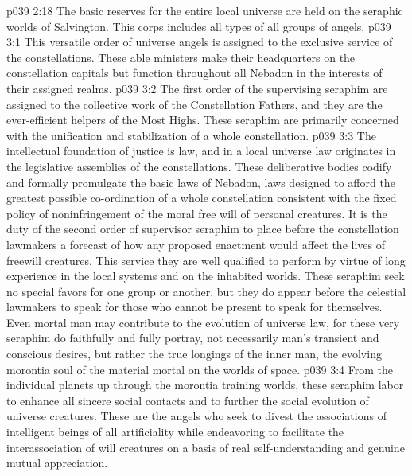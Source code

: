 \pc \vs p039 2:18 The basic reserves for the entire local universe are held on the seraphic worlds of Salvington. This corps includes all types of all groups of angels.
\vs p039 3:1 This versatile order of universe angels is assigned to the exclusive service of the constellations. These able ministers make their headquarters on the constellation capitals but function throughout all Nebadon in the interests of their assigned realms.
\pc \vs p039 3:2 \bibnobreakspace {} The first order of the supervising seraphim are assigned to the collective work of the Constellation Fathers, and they are the ever\hyp{}efficient helpers of the Most Highs. These seraphim are primarily concerned with the unification and stabilization of a whole constellation.\plusone
\pc \vs p039 3:3 \bibnobreakspace {} The intellectual foundation of justice is law, and in a local universe law originates in the legislative assemblies of the constellations. These deliberative bodies codify and formally promulgate the basic laws of Nebadon, laws designed to afford the greatest possible co\hyp{}ordination of a whole constellation consistent with the fixed policy of noninfringement of the moral free will of personal creatures. It is the duty of the second order of supervisor seraphim to place before the constellation lawmakers a forecast of how any proposed enactment would affect the lives of freewill creatures. This service they are well qualified to perform by virtue of long experience in the local systems and on the inhabited worlds. These seraphim seek no special favors for one group or another, but they do appear before the celestial lawmakers to speak for those who cannot be present to speak for themselves. Even mortal man may contribute to the evolution of universe law, for these very seraphim do faithfully and fully portray, not necessarily man’s transient and conscious desires, but rather the true longings of the inner man, the evolving morontia soul of the material mortal on the worlds of space.
\pc \vs p039 3:4 \bibnobreakspace {} From the individual planets up through the morontia training worlds, these seraphim labor to enhance all sincere social contacts and to further the social evolution of universe creatures. These are the angels who seek to divest the associations of intelligent beings of all artificiality while endeavoring to facilitate the interassociation of will creatures on a basis of real self\hyp{}understanding and genuine mutual appreciation.
